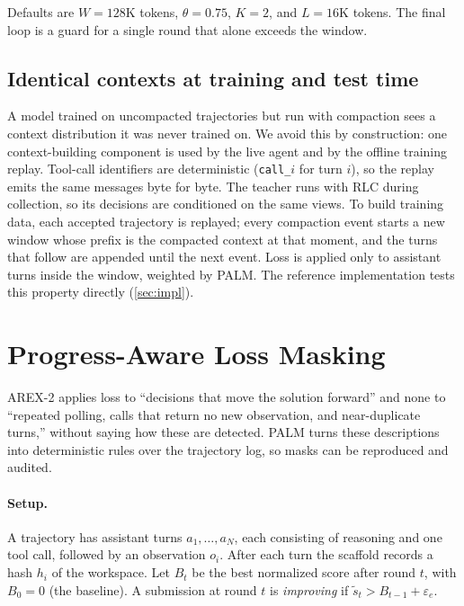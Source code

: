 \documentclass[11pt]{article}
\newcommand{\stilde}{\tilde{s}}
\newcommand{\code}[1]{\texttt{#1}}
\begin{document}
Defaults are $W=128\text{K}$ tokens, $\theta=0.75$, $K=2$, and $L=16\text{K}$ tokens. The final loop is a guard for a single round that alone exceeds the window.

\subsection{Identical contexts at training and test time}
\label{sec:windows}
A model trained on uncompacted trajectories but run with compaction sees a context distribution it was never trained on. We avoid this by construction: one context-building component is used by the live agent and by the offline training replay. Tool-call identifiers are deterministic (\code{call\_}$i$ for turn $i$), so the replay emits the same messages byte for byte. The teacher runs with RLC during collection, so its decisions are conditioned on the same views. To build training data, each accepted trajectory is replayed; every compaction event starts a new window whose prefix is the compacted context at that moment, and the turns that follow are appended until the next event. Loss is applied only to assistant turns inside the window, weighted by PALM. The reference implementation tests this property directly (\cref{sec:impl}).

\section{Progress-Aware Loss Masking}
\label{sec:palm}

AREX-2 applies loss to ``decisions that move the solution forward'' and none to ``repeated polling, calls that return no new observation, and near-duplicate turns,'' without saying how these are detected. PALM turns these descriptions into deterministic rules over the trajectory log, so masks can be reproduced and audited.

\paragraph{Setup.}
A trajectory has assistant turns $a_1,\dots,a_N$, each consisting of reasoning and one tool call, followed by an observation $o_i$. After each turn the scaffold records a hash $h_i$ of the workspace. Let $B_t$ be the best normalized score after round $t$, with $B_0 = 0$ (the baseline). A submission at round $t$ is \emph{improving} if $\stilde_t > B_{t-1} + \varepsilon_e$.
\end{document}
